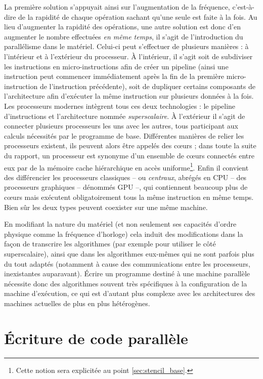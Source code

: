 La première solution s'appuyait ainsi sur l'augmentation de la fréquence, c'est-à-dire de la rapidité de chaque opération sachant qu'une seule est faite à la fois. Au lieu d'augmenter la rapidité des opérations, une autre solution est donc d'en augmenter le nombre effectuées \emph{en même temps}, il s'agit de l'introduction du parallélisme dans le matériel. Celui-ci peut s'effectuer de plusieurs manières : à l'intérieur et à l'extérieur du processeur. À l'intérieur, il s'agit soit de subdiviser les instructions en  micro-instructions afin de créer un pipeline (ainsi une instruction peut commencer immédiatement après la fin de la première micro-instruction de l'instruction précédente), soit de dupliquer certains composants de l'architecture afin d'exécuter la même instruction sur plusieurs données à la fois. Les processeurs modernes intègrent tous ces deux technologies : le pipeline d'instructions et l'architecture nommée \emph{superscalaire}.  À l'extérieur il s'agit de connecter plusieurs processeurs les uns avec les autres, tous participant aux calculs nécessités par le programme de base. Différentes manières de relier les processeurs existent, ils peuvent alors être appelés des cœurs ; dans toute la suite du rapport, un processeur est synonyme d'un ensemble de cœurs connectés entre eux par de la mémoire cache hiérarchique en accès uniforme\footnote{Cette notion sera explicitée au point \ref{sec:stencil_base}.}. Enfin il convient des différencier les processeurs classiques -- ou \emph{centraux}, abrégés en CPU -- des processeurs graphiques -- dénommés GPU --, qui contiennent beaucoup plus de cœurs mais exécutent obligatoirement tous la même instruction en même temps. Bien sûr les deux types peuvent coexister sur une même machine.

En modifiant la nature du matériel (et non seulement ses capacités d'ordre physique comme la fréquence d'horloge) cela induit des modifications dans la façon de transcrire les algorithmes (par exemple pour utiliser le côté superscalaire), ainsi que dans les algorithmes eux-mêmes qui ne sont parfois plus du tout adaptés (notamment à cause des communications entre les processeurs, inexistantes auparavant). Écrire un programme destiné à une machine parallèle nécessite donc des algorithmes souvent très spécifiques à la configuration de la machine d'exécution, ce qui est d'autant plus complexe avec les architectures des machines actuelles de plus en plus hétérogènes.

\section{\'Ecriture de code parallèle}

